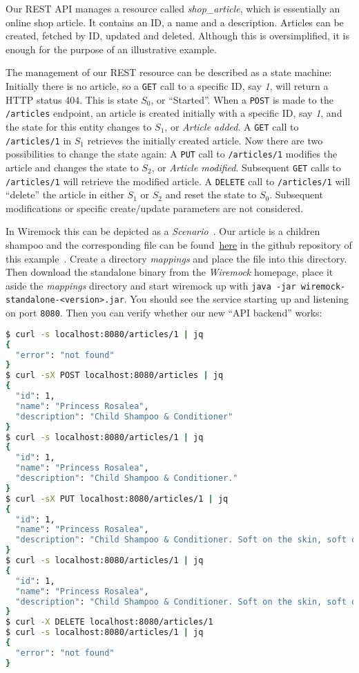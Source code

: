 \documentclass[paper=a4,11pt,numbers=noenddot]{article}
\begin{document}
Our REST API manages a resource called \emph{shop\_article}, which is essentially an online shop article. It contains an ID, a name and a description. Articles can be created, fetched by ID, updated and deleted. Although this is oversimplified, it is enough for the purpose of an illustrative example.

The management of our REST resource can be described as a state machine: Initially there is no article, so a \verb'GET' call to a specific ID, say \emph{1}, will return a HTTP status 404. This is state $S_0$, or ``Started''. When a \verb'POST' is made to the \verb'/articles' endpoint, an article is created initially with a specific ID, say \emph{1}, and the state for this entity changes to $S_1$, or \emph{Article added}. A \verb'GET' call to \verb'/articles/1' in $S_1$ retrieves the initially created article. Now there are two possibilities to change the state again: A \verb'PUT' call to \verb'/articles/1' modifies the article and changes the state to $S_2$, or \emph{Article modified}. Subsequent \verb'GET' calls to \verb'/articles/1' will retrieve the modified article. A \verb'DELETE' call to \verb'/articles/1' will ``delete'' the article in either $S_1$ or $S_2$ and reset the state to $S_0$. Subsequent modifications or specific create/update parameters are not considered.

In Wiremock this can be depicted as a \emph{Scenario}~\cite{noauthor_wiremock_stateful_behavior_2025}. Our article is a children shampoo and the corresponding file can be found~\href{https://github.com/ecky-l/terraform-provider-example/blob/main/src/wiremock/mappings/shampoo.json}{here} in the github repository of this example~\cite{ecky-l_terraform-provider-example_nodate}. Create a directory \emph{mappings} and place the file into this directory. Then download the standalone binary from the \emph{Wiremock} homepage, place it aside the \emph{mappings} directory and start wiremock up with \verb'java -jar wiremock-standalone-<version>.jar'. You should see the service starting up and listening on port \verb'8080'. Then you can verify whether our new ``API backend'' works:

\begin{lstlisting}[language=bash]
$ curl -s localhost:8080/articles/1 | jq
{
  "error": "not found"
}
$ curl -sX POST localhost:8080/articles | jq
{
  "id": 1,
  "name": "Princess Rosalea",
  "description": "Child Shampoo & Conditioner"
}
$ curl -s localhost:8080/articles/1 | jq
{
  "id": 1,
  "name": "Princess Rosalea",
  "description": "Child Shampoo & Conditioner."
}
$ curl -sX PUT localhost:8080/articles/1 | jq
{
  "id": 1,
  "name": "Princess Rosalea",
  "description": "Child Shampoo & Conditioner. Soft on the skin, soft on the environment."
}
$ curl -s localhost:8080/articles/1 | jq
{
  "id": 1,
  "name": "Princess Rosalea",
  "description": "Child Shampoo & Conditioner. Soft on the skin, soft on the environment."
}
$ curl -X DELETE localhost:8080/articles/1
$ curl -s localhost:8080/articles/1 | jq
{
  "error": "not found"
}
\end{lstlisting}
\end{document}
